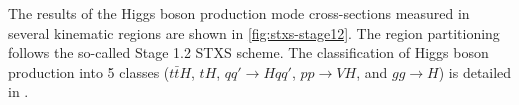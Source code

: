 
The results of the Higgs boson production mode cross-sections measured in several kinematic regions are shown in \cref{fig:stxs-stage12}. The region partitioning follows the so-called Stage 1.2 STXS scheme. 
The classification of Higgs boson production into 5 classes ($t\bar{t}H$, $tH$, $qq'\to Hqq'$, $pp\to VH$, and $gg\to H$) is detailed in \cite{NaturePaper}. 




